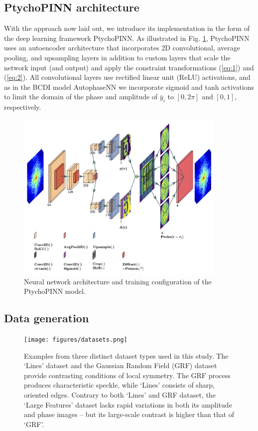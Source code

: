 \documentclass[sn-mathphys]{sn-jnl}%
\theoremstyle{thmstyleone}%
\theoremstyle{thmstyletwo}%
\theoremstyle{thmstylethree}%
\begin{document}
\subsection{PtychoPINN architecture}
With the approach now laid out, we introduce its implementation in the form of the deep learning framework PtychoPINN. As illustrated in Fig. \ref{diagram}, PtychoPINN uses an autoencoder architecture that incorporates 2D convolutional, average pooling, and upsampling layers in addition to custom layers that scale the network input (and output) and apply the constraint transformations (\ref{eq:1}) and (\ref{eq:2}). All convolutional layers use rectified linear unit (ReLU) activations, and as in the BCDI model AutophaseNN we incorporate sigmoid and tanh activations to limit the domain of the phase and amplitude of $\bar{y}_i$ to $[0, 2 \pi]$ and $[0, 1]$, respectively. \cite{yao2022autophasenn}

\begin{figure}[h]%
\centering
\includegraphics[width=0.9\textwidth]{figures/lett.png}
\caption{Neural network architecture and training configuration of the PtychoPINN model.}\label{diagram}
\end{figure}

\subsection{Data generation}\label{data}

\begin{figure}
    \centering
    {{\texttt{[image: figures/datasets.png]} }}%
    \caption{Examples from three distinct dataset types used in this study. The `Lines' dataset and the Gaussian Random Field (GRF) dataset provide contrasting conditions of local symmetry. The GRF process produces characteristic speckle, while `Lines' consists of sharp, oriented edges. Contrary to both `Lines' and GRF dataset, the `Large Features' dataset lacks rapid variations in both its amplitude and phase images -- but its large-scale contrast is higher than that of `GRF'. }%
    \label{fig:datasets}%
\end{figure}
\end{document}
